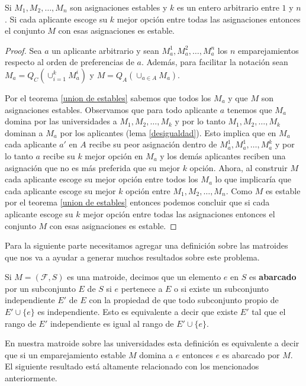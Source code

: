 \begin{teo}
Si $M_1,M_2,\dots,M_n$ son asignaciones estables y $k$ es un entero arbitrario entre $1$ y $n$. Si cada aplicante escoge su $k$ mejor opción entre todas las asignaciones entonces el conjunto $M$ con esas asignaciones es estable. 
\end{teo}
\begin{proof}
Sea $a$ un aplicante arbitrario y sean $M_a^1,M_a^2,\dots,M_a^n$ los $n$ emparejamientos respecto al orden de preferencias de $a$. Además, para facilitar la notación sean $M_a = Q_C(\cup_{i=1}^kM_a^i)$ y $M=Q_A( \cup_{a \in A} M_a)$.

Por el teorema \ref{union de estables} sabemos que todos los $M_a$ y que $M$ son asignaciones estables. Observamos que para todo aplicante $a$ tenemos que $M_a$ domina por las universidades a $M_1,M_2,\dots,M_k$ y por lo tanto $M_1,M_2,\dots,M_k$ dominan a $M_a$ por los aplicantes (lema \ref{desigualdad}). Esto implica que en $M_a$ cada aplicante $a'$ en $A$ recibe su peor asignación dentro de $M_a^1,M_a^1,\dots,M_a^k$ y por lo tanto $a$ recibe su $k$ mejor opción en $M_a$ y los demás aplicantes reciben una asignación que no es más preferida que su mejor $k$ opción. Ahora, al construir $M$ cada aplicante escoge su mejor opción entre todos los $M_a$ lo que implicaría que cada aplicante escoge su mejor $k$ opción entre $M_1,M_2,\dots,M_n$. Como $M$ es estable por el teorema \ref{union de estables} entonces podemos concluir que si cada aplicante escoge su $k$ mejor opción entre todas las asignaciones entonces el conjunto $M$ con esas asignaciones es estable.
\end{proof}

Para la siguiente parte necesitamos agregar una definición sobre las matroides que nos va a ayudar a generar muchos resultados sobre este problema.

\begin{dfn}
Si $M=(\mathcal{F},S)$ es una matroide, decimos que un elemento $e$ en $S$ es \textbf{abarcado} por un subconjunto $E$ de $S$ si $e$ pertenece a $E$ o si existe un subconjunto independiente $E'$ de $E$ con la propiedad de que todo subconjunto propio de $E' \cup \{e\}$ es independiente. Esto es equivalente a decir que existe $E'$ tal que el rango de $E'$ independiente es igual al rango de $E' \cup \{e\}$. 
\end{dfn}

En nuestra matroide sobre las universidades esta definición es equivalente a decir que si un emparejamiento estable $M$ domina a $e$ entonces $e$ es abarcado por $M$. El siguiente resultado está altamente relacionado con los mencionados anteriormente. 

